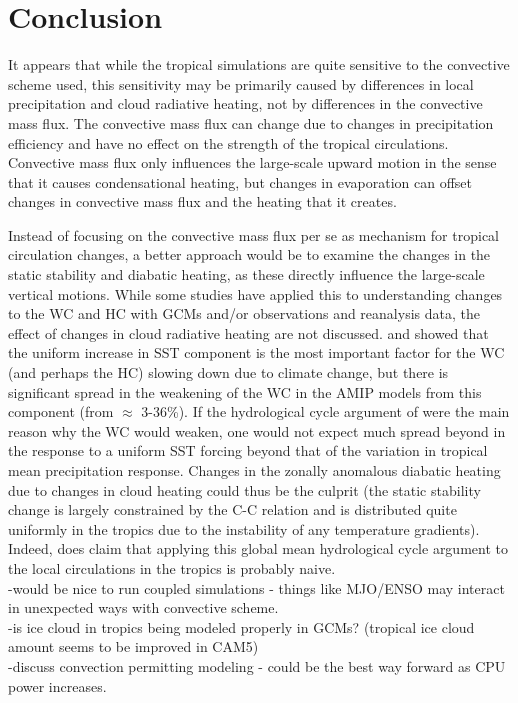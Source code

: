\documentclass[letterpaper,12pt,titlepage,oneside,final]{book}
\begin{document}
\chapter{Conclusion}
It appears that while the tropical simulations are quite sensitive to the convective scheme used, this sensitivity may be primarily caused by differences in local precipitation and cloud radiative heating, not by differences in the convective mass flux. The convective mass flux can change due to changes in precipitation efficiency and have no effect on the strength of the tropical circulations. Convective mass flux only influences the large-scale upward motion in the sense that it causes condensational heating, but changes in evaporation can offset changes in convective mass flux and the heating that it creates.

Instead of focusing on the convective mass flux per se as mechanism for tropical circulation changes, a better approach would be to examine the changes in the static stability and diabatic heating, as these directly influence the large-scale vertical motions. While some studies have applied this to understanding changes to the WC \citep{sohn_role_2016,ma_mechanisms_2011} and HC \citep{mitas_recent_2006,ma_mechanisms_2011} with GCMs and/or observations and reanalysis data, the effect of changes in cloud radiative heating are not discussed. \citep{he_anthropogenic_2015} and \citep{ma_mechanisms_2011} showed that the uniform increase in SST component is the most important factor for the WC (and perhaps the HC) slowing down due to climate change, but there is significant spread in the weakening of the WC in the AMIP models from this component (from $\approx$ 3-36\%). If the hydrological cycle argument of \citep{held_robust_2006} were the main reason why the WC would weaken, one would not expect much spread beyond in the response to a uniform SST forcing beyond that of the variation in tropical mean precipitation response. Changes in the zonally anomalous diabatic heating due to changes in cloud heating could thus be the culprit (the static stability change is largely constrained by the C-C relation and is distributed quite uniformly in the tropics due to the instability of any temperature gradients). Indeed, \citep{schneider_water_2010} does claim that applying this global mean hydrological cycle argument to the local circulations in the tropics is probably naive.
\\
-would be nice to run coupled simulations - things like MJO/ENSO may interact in unexpected ways with convective scheme.
\\
-is ice cloud in tropics being modeled properly in GCMs? (tropical ice cloud amount seems to be improved in CAM5)
\\
-discuss convection permitting modeling - could be the best way forward as CPU power increases.
\\
\end{document}
